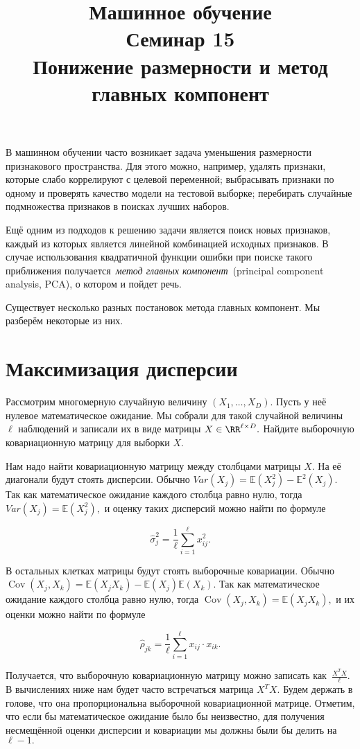 \documentclass[12pt,fleqn]{article}
\title{Машинное обучение\\Семинар 15\\Понижение размерности и метод главных компонент}
\author{}
\date{}
\DeclareMathOperator{\Cov}{Cov}
\def \E{\mathbb{E}}
\begin{document}
\maketitle

В машинном обучении часто возникает задача уменьшения размерности признакового пространства. Для этого можно, например, удалять признаки, которые слабо коррелируют с целевой переменной; выбрасывать признаки по одному и проверять качество модели на тестовой выборке; перебирать случайные подмножества признаков в поисках лучших наборов.

Ещё одним из подходов к решению задачи является поиск новых признаков, каждый из которых является линейной комбинацией исходных признаков. В случае использования квадратичной функции ошибки при поиске такого приближения получается~\emph{метод главных компонент}~(principal component analysis, PCA), о котором и пойдет речь. 

Существует несколько разных постановок метода главных компонент. Мы разберём некоторые из них. 


\section{Максимизация дисперсии}

\begin{vkProblem} Рассмотрим многомерную случайную величину $(X_1, \ldots, X_D).$  Пусть у неё нулевое математическое ожидание. Мы собрали для такой случайной величины $\ell$ наблюдений и записали их в виде матрицы $X \in \RR^{\ell \times D}.$ Найдите выборочную ковариационную матрицу для выборки $X$.
\end{vkProblem}
\begin{esSolution}
Нам надо найти ковариационную матрицу между столбцами матрицы $X$. На её диагонали будут стоять дисперсии. Обычно $Var(X_j) = \E(X_j^2) - \E^2(X_j).$ Так как математическое ожидание каждого столбца равно нулю, тогда $Var(X_j) = \E(X_j^2),$ и оценку таких дисперсий можно найти по формуле

\[
\hat{\sigma}^2_j = \frac{1}{\ell} \sum_{i=1}^{\ell} x_{ij}^2.
\]

В остальных клетках матрицы будут стоять выборочные ковариации. Обычно $\Cov(X_j, X_k) = \E(X_j X_k) - \E(X_j) \E(X_k).$ Так как математическое ожидание каждого столбца равно нулю, тогда $\Cov(X_j, X_k) = \E(X_j X_k),$ и их оценки можно найти по формуле

\[
\hat{\rho}_{jk} = \frac{1}{\ell} \sum_{i=1}^{\ell} x_{ij}\cdot x_{ik}.
\]

Получается, что выборочную ковариационную матрицу можно записать как~$\frac{X^TX}{\ell}.$ В вычислениях ниже нам будет часто встречаться матрица $X^TX.$ Будем держать в голове, что она пропорциональна выборочной ковариационной матрице. Отметим, что если бы математическое ожидание было бы неизвестно, для получения несмещённой оценки дисперсии и ковариации мы должны были бы делить на $\ell - 1.$
\end{esSolution}
\end{document}
